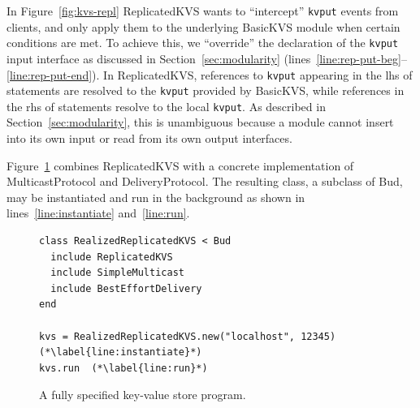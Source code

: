 In Figure~\ref{fig:kvs-repl} ReplicatedKVS wants to ``intercept'' \texttt{kvput} events from
clients, and only apply them to the underlying BasicKVS module when certain
conditions are met. To achieve this, we ``override'' the declaration of the
\texttt{kvput} input interface as discussed in Section~\ref{sec:modularity}
(lines~\ref{line:rep-put-beg}--\ref{line:rep-put-end}). In ReplicatedKVS,
references to \texttt{kvput} appearing in the lhs of statements are resolved to the
\texttt{kvput} provided by BasicKVS, while references in the rhs of statements
resolve to the local \texttt{kvput}. As described in
Section~\ref{sec:modularity}, this is unambiguous because a module cannot insert
into its own input or read from its own output interfaces.

Figure~\ref{fig:kvs-budclass} combines ReplicatedKVS with a concrete
implementation of MulticastProtocol and DeliveryProtocol.  The resulting class,
a subclass of Bud, may be instantiated and run in the background as shown in
lines~\ref{line:instantiate} and~\ref{line:run}.

\begin{figure}[t]
\begin{scriptsize}
\begin{lstlisting}
class RealizedReplicatedKVS < Bud
  include ReplicatedKVS
  include SimpleMulticast
  include BestEffortDelivery
end

kvs = RealizedReplicatedKVS.new("localhost", 12345)  (*\label{line:instantiate}*)
kvs.run  (*\label{line:run}*)
\end{lstlisting}
\centering
\vspace{-10pt}
\caption{A fully specified key-value store program.}
\label{fig:kvs-budclass}
\end{scriptsize}
\vspace{-2pt}
\end{figure}

